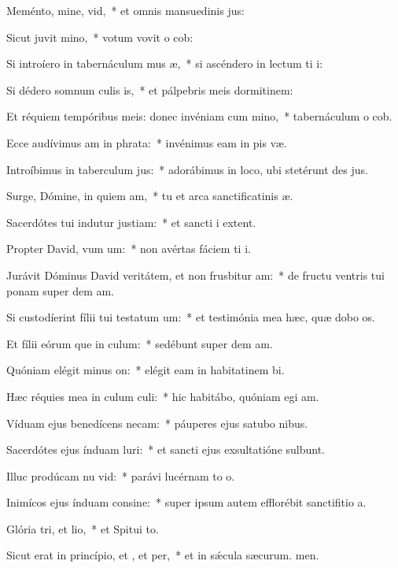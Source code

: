 \item Meménto, mine, vid,~* et omnis mansuedinis jus:
\item Sicut juvit mino,~* votum vovit o cob:
\item Si introíero in tabernáculum mus æ,~* si ascéndero in lectum ti i:
\item Si dédero somnum culis is,~* et pálpebris meis dormitinem:
\item Et réquiem tempóribus meis: donec invéniam cum mino,~* tabernáculum o cob.
\item Ecce audívimus am in phrata:~* invénimus eam in pis væ.
\item Introíbimus in taberculum jus:~* adorábimus in loco, ubi stetérunt des jus.
\item Surge, Dómine, in quiem am,~* tu et arca sanctificatinis æ.
\item Sacerdótes tui indutur justiam:~* et sancti i extent.
\item Propter David, vum um:~* non avértas fáciem ti i.
\item Jurávit Dóminus David veritátem, et non frusbitur am:~* de fructu ventris tui ponam super dem am.
\item Si custodíerint fílii tui testatum um:~* et testimónia mea hæc, quæ dobo os.
\item Et fílii eórum que in culum:~* sedébunt super dem am.
\item Quóniam elégit minus on:~* elégit eam in habitatinem bi.
\item Hæc réquies mea in culum culi:~* hic habitábo, quóniam egi am.
\item Víduam ejus benedícens necam:~* páuperes ejus satubo nibus.
\item Sacerdótes ejus índuam luri:~* et sancti ejus exsultatióne sulbunt.
\item Illuc prodúcam nu vid:~* parávi lucérnam to o.
\item Inimícos ejus índuam consine:~* super ipsum autem efflorébit sanctifitio a.
\item Glória tri, et lio,~* et Spitui to.
\item Sicut erat in princípio, et , et per,~* et in sǽcula sæcurum. men.
